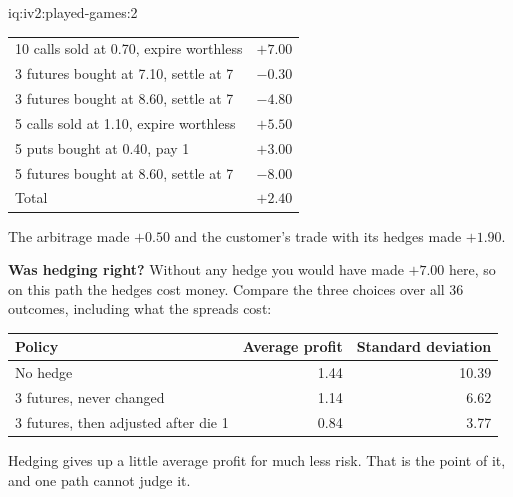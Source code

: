 \begin{solution}{iq:iv2:played-games:2}
\ivstop

\begin{center}\small
\begin{tabular}{@{}lr@{}}
10 calls sold at 0.70, expire worthless & $+7.00$ \\
3 futures bought at 7.10, settle at 7 & $-0.30$ \\
3 futures bought at 8.60, settle at 7 & $-4.80$ \\
5 calls sold at 1.10, expire worthless & $+5.50$ \\
5 puts bought at 0.40, pay 1 & $+3.00$ \\
5 futures bought at 8.60, settle at 7 & $-8.00$ \\ \hline
Total & $+2.40$
\end{tabular}
\end{center}
The arbitrage made $+0.50$ and the customer's trade with its hedges made $+1.90$.

\textbf{Was hedging right?} Without any hedge you would have made $+7.00$ here, so on this path the hedges cost money. Compare the three choices over all 36 outcomes, including what the spreads cost:
\begin{center}\small
\begin{tabular}{@{}lrr@{}}
Policy & Average profit & Standard deviation \\ \hline
No hedge & 1.44 & 10.39 \\
3 futures, never changed & 1.14 & 6.62 \\
3 futures, then adjusted after die 1 & 0.84 & 3.77
\end{tabular}
\end{center}
Hedging gives up a little average profit for much less risk. That is the point of it, and one path cannot judge it.

\end{solution}

